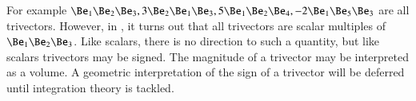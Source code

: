 For example \( \Be_1 \Be_2 \Be_3, 3 \Be_2 \Be_1 \Be_3, 5 \Be_1 \Be_2 \Be_4, - 2 \Be_1 \Be_5 \Be_3 \) are all trivectors.  However,
in , it turns out that all trivectors are scalar multiples of \( \Be_1 \Be_2 \Be_3 \).
Like scalars, there is no direction to such a quantity, but like scalars trivectors may be signed.  The magnitude of a trivector may be interpreted as a volume.
A geometric interpretation of the sign of a trivector will be deferred until integration theory is tackled.
